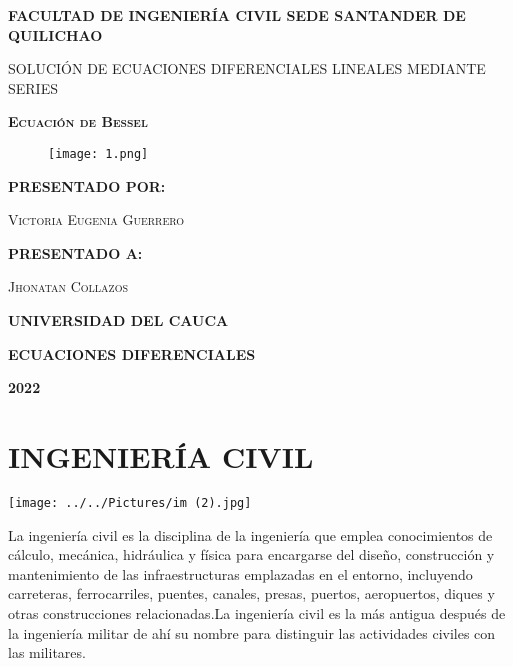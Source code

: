 \documentclass[12pt,a4paper]{article}
\begin{document}
\begin{center}
{\bfseries\Large FACULTAD DE INGENIER\'IA CIVIL SEDE SANTANDER DE QUILICHAO \par}
\vspace{1cm}
{\scshape\Large SOLUCI\'ON DE ECUACIONES DIFERENCIALES LINEALES MEDIANTE SERIES \par}
{\scshape\Large\textbf{Ecuaci\'on de Bessel}\par}
\vspace{1cm}
\begin{figure}[h!]
\centering
\texttt{[image: 1.png]} 
\end{figure}
\vspace{1cm}
{\scshape\Large \textbf{PRESENTADO POR:} \par}
{\scshape\Large Victoria Eugenia Guerrero\par}
{\scshape\Large \textbf{PRESENTADO A:} \par}
{\scshape\Large Jhonatan Collazos \par}
\vspace{1,5cm}
{\scshape\Large \textbf{UNIVERSIDAD DEL CAUCA} \par}
{\scshape\Large \textbf{ECUACIONES DIFERENCIALES} \par}
{\scshape\Large \textbf{2022} \par}
\end{center}

\tableofcontents 

\vspace{15cm}	

\section{INGENIER\'IA CIVIL}
\vspace{0,5cm}
\texttt{[image: ../../Pictures/im (2).jpg]}

\vspace{0,5cm}

La ingeniería civil es la disciplina de la ingeniería que emplea conocimientos de cálculo, mecánica, hidráulica y física para encargarse del diseño, construcción y mantenimiento de las infraestructuras emplazadas en el entorno, incluyendo carreteras, ferrocarriles, puentes, canales, presas, puertos, aeropuertos, diques y otras construcciones relacionadas.La ingeniería civil es la más antigua después de la ingeniería militar de ahí su nombre para distinguir las actividades civiles con las militares.
\end{document}
